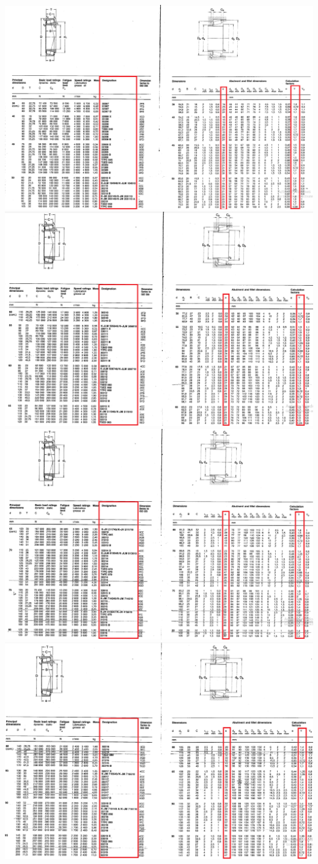 \documentclass{article}
\begin{document}
\\
\includegraphics[width=0.9\linewidth]{7.png}
\\
\includegraphics[width=0.9\linewidth]{8.png}
\\
\includegraphics[width=0.9\linewidth]{9.png}
\\
\includegraphics[width=0.9\linewidth]{10.png}
\end{document}
